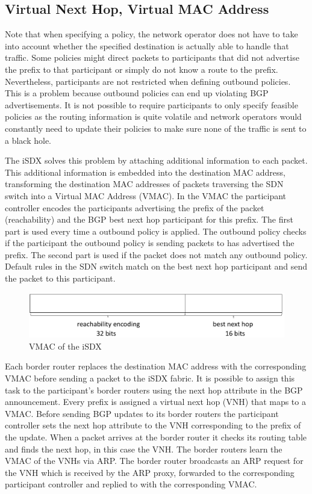 \subsection{\label{chapter2:iSDX:VNH_VMAC}Virtual Next Hop, Virtual MAC Address}

Note that when specifying a policy, the network operator does not have to take into account whether the specified destination is actually able to handle that traffic. Some policies might direct packets to participants that did not advertise the prefix to that participant or simply do not know a route to the prefix. Nevertheless, participants are not restricted when defining outbound policies. This is a problem because outbound policies can end up violating BGP advertisements. It is not possible to require participants to only specify feasible policies as the routing information is quite volatile and network operators would constantly need to update their policies to make sure none of the traffic is sent to a black hole. 

The iSDX solves this problem by attaching additional information to each packet. This additional information is embedded into the destination MAC address, transforming the destination MAC addresses of packets traversing the SDN switch into a Virtual MAC Address (VMAC).
In the VMAC the participant controller encodes the participants advertising the prefix of the packet (reachability) and the BGP best next hop participant for this prefix. The first part is used every time a outbound policy is applied. The outbound policy checks if the participant the outbound policy is sending packets to has advertised the prefix. The second part is used if the packet does not match any outbound policy. Default rules in the SDN switch match on the best next hop participant and send the packet to this participant.

\begin{figure}[h]
\center
\includegraphics[scale = 0.5]{Figures/sdx_vmac4_cropped.pdf}
\caption{VMAC of the iSDX}
\end{figure}

Each border router replaces the destination MAC address with the corresponding VMAC before sending a packet to the iSDX fabric. It is possible to assign this task to the participant's border routers using the next hop attribute in the BGP announcement. Every prefix is assigned a virtual next hop (VNH) that maps to a VMAC. Before sending BGP updates to its border routers the participant controller sets the next hop attribute to the VNH corresponding to the prefix of the update.  When a packet arrives at the border router it checks its routing table and finds the next hop, in this case the VNH. The border routers learn the VMAC of the VNHs via ARP. The border router broadcasts an ARP request for the VNH which is received by the ARP proxy, forwarded to the corresponding participant controller and replied to with the corresponding VMAC.

